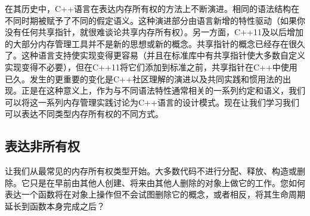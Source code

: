 在其历史中，C++语言在表达内存所有权的方法上不断演进。相同的语法结构在不同时期被赋予了不同的假定语义。这种演进部分由语言新增的特性驱动（如果你没有任何共享指针，就很难谈论共享内存所有权）。另一方面，C++11及以后增加的大部分内存管理工具并不是新的思想或新的概念。共享指针的概念已经存在很久了。这种语言支持使实现变得更容易（并且在标准库中有共享指针使大多数自定义实现变得不必要），但在C++11将它们添加到标准之前，共享指针在C++中使用已久。发生的更重要的变化是C++社区理解的演进以及共同实践和惯用法的出现。正是在这种意义上，作为与不同语法特性通常相关的一系列约定和语义，我们可以将这一系列内存管理实践讨论为C++语言的设计模式。现在让我们学习我们可以表达不同类型内存所有权的不同方式。

\subsection{表达非所有权}

让我们从最常见的内存所有权类型开始。大多数代码不进行分配、释放、构造或删除。它只是在早前由其他人创建、将来由其他人删除的对象上做它的工作。您如何表达一个函数将在对象上操作但不会试图删除它的概念，或者相反，将其生命周期延长到函数本身完成之后？

